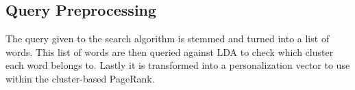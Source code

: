 \subsection{Query Preprocessing}
The query given to the search algorithm is stemmed and turned into a list of words. 
This list of words are then queried against LDA to check which cluster each word belongs to.
Lastly it is transformed into a personalization vector to use within the cluster-based PageRank.

